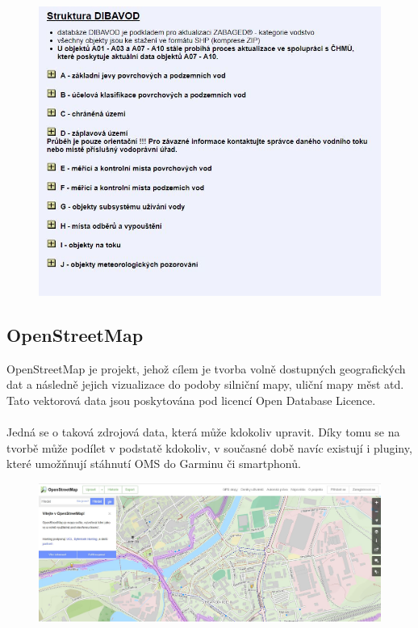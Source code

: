 \documentclass[a4paper, 12pt]{article}
\begin{document}
\begin{figure}[h!]
	\centering
	\includegraphics[width=13cm]{pictures/dibavod.jpg}
\end{figure}

\subsection{OpenStreetMap}
OpenStreetMap je projekt, jehož cílem je tvorba volně dostupných geografických dat a následně jejich vizualizace do podoby silniční mapy, uliční mapy měst atd. Tato vektorová data jsou poskytována pod licencí Open Database Licence. \\
\\
Jedná se o taková zdrojová data, která může kdokoliv upravit. Díky tomu se na tvorbě může podílet v podstatě kdokoliv, v současné době navíc existují i pluginy, které umožňnují stáhnutí OMS do Garminu či smartphonů. 

\begin{figure}[h!]
	\centering
	\includegraphics[width=14cm]{pictures/osm.jpg}
\end{figure}
\end{document}
